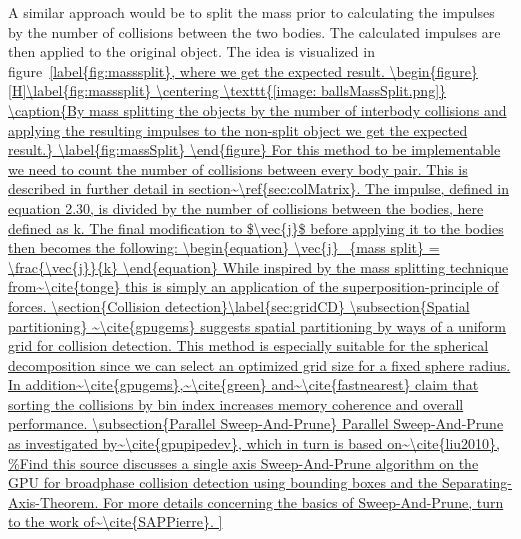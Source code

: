 A similar approach would be to split the mass prior to
calculating the impulses by the number of collisions between the two bodies. The
calculated impulses are then applied to the original object. The idea is visualized in figure~\ref{label{fig:masssplit}, where
we get the expected result.

\begin{figure}[H]\label{fig:masssplit}
  \centering
  \texttt{[image: ballsMassSplit.png]}
  \caption{By mass splitting the objects by the number of interbody collisions
  and applying the resulting impulses to the non-split object we get the expected result.}
  \label{fig:massSplit}
\end{figure}

For this method to be implementable we need to count the number of collisions between
every body pair. This is described in further detail in section~\ref{sec:colMatrix}.

The impulse, defined in equation 2.30, is divided by the number of collisions
 between the bodies, here defined as k. The final modification to
$\vec{j}$ before applying it to the bodies then becomes the following:

\begin{equation}
  \vec{j}_{mass split} = \frac{\vec{j}}{k}
\end{equation}

While inspired by the mass splitting technique from~\cite{tonge}
this is simply an application of the superposition-principle
of forces.

\section{Collision detection}\label{sec:gridCD}
\subsection{Spatial partitioning}
~\cite{gpugems} suggests spatial partitioning
by ways of a uniform grid for collision detection. This method is especially suitable
for the spherical decomposition since we can select an optimized
grid size for a fixed sphere radius. In addition~\cite{gpugems},~\cite{green} and~\cite{fastnearest} claim that sorting
the collisions by bin index increases memory coherence and overall performance.

\subsection{Parallel Sweep-And-Prune}
Parallel Sweep-And-Prune as investigated by~\cite{gpupipedev}, which in turn is based on~\cite{liu2010}, %
discusses a single axis Sweep-And-Prune algorithm on the GPU for broadphase collision
detection using bounding boxes and the Separating-Axis-Theorem. For more details
concerning the basics of Sweep-And-Prune, turn to the work of~\cite{SAPPierre}.

}
